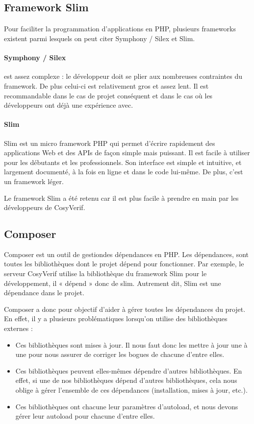 \documentclass{report}
\begin{document}
\subsection{Framework Slim}

\paragraph{}
Pour faciliter la programmation d'applications en PHP, plusieurs frameworks
existent parmi lesquels on peut citer Symphony / Silex et Slim. 

\paragraph{Symphony / Silex}
est assez complexe : le développeur doit se plier aux nombreuses contraintes
du framework. De plus celui-ci est relativement gros et
assez lent. Il est recommandable dans le cas de projet conséquent et dans le cas où les développeurs ont déjà une 
expérience avec.

\paragraph{Slim}
Slim est un micro framework PHP qui permet d'écrire rapidement des applications Web et des APIs de façon simple 
mais puissant. Il est facile à utiliser pour les débutants et les professionnels. Son interface est simple et intuitive, et 
largement documenté, à la fois en ligne et dans le code lui-même. De plus, c'est un framework léger.

Le framework Slim a été retenu car il est plus facile à prendre en main par les développeurs de CosyVerif.

\subsection{Composer}

Composer est un outil de gestiondes dépendances en PHP. Les dépendances, sont toutes les 
bibliothèques dont le projet dépend pour fonctionner. Par exemple, le serveur CosyVerif utilise la bibliothèque 
du framework Slim pour le développement, il « dépend » donc de slim. Autrement dit, Slim est une dépendance 
dans le projet.

Composer a donc pour objectif d'aider à gérer toutes les dépendances du projet. En effet, il y a plusieurs problématiques
lorsqu'on utilise des bibliothèques externes :
\begin{itemize}
\item  Ces bibliothèques sont mises à jour. Il nous faut donc les mettre à jour une à une pour nous assurer de corriger les
 bogues de chacune d'entre elles.
\item Ces bibliothèques peuvent elles-mêmes dépendre d'autres bibliothèques. En effet, si une de nos bibliothèques 
dépend d'autres bibliothèques, cela nous oblige à gérer l'ensemble de ces dépendances (installation, mises à jour, etc.).
\item Ces bibliothèques ont chacune leur paramètres d'autoload, et nous devons gérer leur autoload pour chacune 
d'entre elles.
\end{itemize}
\end{document}
